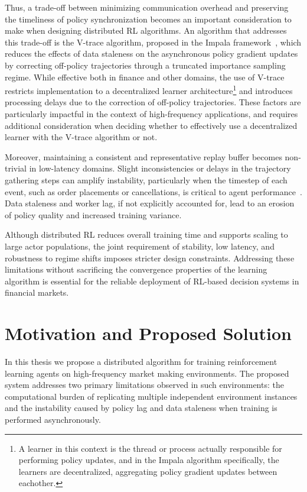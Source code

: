 Thus, a trade-off between minimizing communication overhead and preserving the timeliness of policy synchronization
becomes an important consideration to make when designing distributed RL algorithms.
An algorithm that addresses this trade-off is the V-trace algorithm, proposed in the Impala framework~\citep{Espeholt2018},
which reduces the effects of data staleness on the asynchronous policy gradient updates by
correcting off-policy trajectories through a truncated importance sampling regime.
While effective both in finance and other domains,
the use of V-trace restricts implementation to a decentralized learner architecture\footnote{
    A learner in this context is the thread or process actually responsible for performing policy updates,
    and in the Impala algorithm specifically, the learners are decentralized, aggregating policy gradient updates between eachother.
} and introduces processing delays due to the correction of off-policy trajectories.
These factors are particularly impactful in the context of high-frequency applications,
and requires additional consideration when deciding whether to effectively use a decentralized learner with the V-trace algorithm or not.

Moreover, maintaining a consistent and representative replay buffer becomes non-trivial in low-latency domains.
Slight inconsistencies or delays in the trajectory gathering steps can amplify instability,
particularly when the timestep of each event, such as order placements or cancellations, is critical to agent performance~\citep{Zhang2024, Kopic2024}.
Data staleness and worker lag, if not explicitly accounted for, lead to an erosion of policy quality and increased training variance.

Although distributed RL reduces overall training time and supports scaling to large actor populations,
the joint requirement of stability, low latency, and robustness to regime shifts imposes stricter design constraints.
Addressing these limitations without sacrificing the convergence properties of the learning algorithm is essential
for the reliable deployment of RL-based decision systems in financial markets.

\section{Motivation and Proposed Solution}
\label{sec:motivation}

In this thesis we propose a distributed algorithm for training reinforcement learning agents on high-frequency market making environments.
The proposed system addresses two primary limitations observed in such environments:
the computational burden of replicating multiple independent environment instances and the instability caused by
policy lag and data staleness when training is performed asynchronously.


